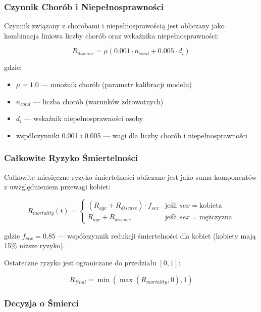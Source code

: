 \documentclass[]{article}
\begin{document}
\subsubsection{Czynnik Chorób i Niepełnosprawności}

Czynnik związany z chorobami i niepełnosprawością jest obliczany jako kombinacja liniowa liczby chorób oraz wskaźnika niepełnosprawności:

\begin{equation}
R_{disease} = \mu \left(0.001 \cdot n_{cond} + 0.005 \cdot d_i\right)
\end{equation}

gdzie:
\begin{itemize}
    \item $\mu = 1.0$ --- mnożnik chorób (parametr kalibracji modelu)
    \item $n_{cond}$ --- liczba chorób (warunków zdrowotnych)
    \item $d_i$ --- wskaźnik niepełnosprawności osoby
    \item współczynniki 0.001 i 0.005 --- wagi dla liczby chorób i niepełnosprawności
\end{itemize}

\subsubsection{Całkowite Ryzyko Śmiertelności}

Całkowite miesięczne ryzyko śmiertelności obliczane jest jako suma komponentów z uwzględnieniem przewagi kobiet:

\begin{equation}
R_{mortality}(t) = \begin{cases}
(R_{age} + R_{disease}) \cdot f_{sex} & \text{jeśli } sex = \text{kobieta} \\
R_{age} + R_{disease} & \text{jeśli } sex = \text{mężczyzna}
\end{cases}
\end{equation}

gdzie $f_{sex} = 0.85$ --- współczynnik redukcji śmiertelności dla kobiet (kobiety mają 15\% niższe ryzyko).

Ostateczne ryzyko jest ograniczane do przedziału $[0, 1]$:

\begin{equation}
R_{final} = \min\left(\max(R_{mortality}, 0), 1\right)
\end{equation}

\subsubsection{Decyzja o Śmierci}
\end{document}
